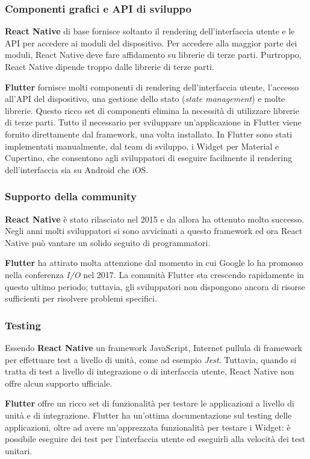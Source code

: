 \subsubsection{Componenti grafici e API di sviluppo}
\textbf{React Native} di base fornisce soltanto il rendering dell'interfaccia utente e le API per accedere ai moduli del dispositivo. Per accedere alla maggior parte dei moduli, React Native deve fare affidamento su librerie di terze parti. Purtroppo, React Native dipende troppo dalle librerie di terze parti.

\textbf{Flutter} fornisce molti componenti di rendering dell'interfaccia utente, l'accesso all'API del dispositivo, una gestione dello stato (\textit{state management}) e molte librerie. Questo ricco set di componenti elimina la necessità di utilizzare librerie di terze parti. Tutto il necessario per sviluppare un'applicazione in Flutter viene fornito direttamente dal framework, una volta installato. In Flutter sono stati implementati manualmente, dal team di sviluppo, i Widget per Material e Cupertino, che consentono agli sviluppatori di eseguire facilmente il rendering dell'interfaccia sia su Android che iOS.

\subsubsection{Supporto della community}
\textbf{React Native} è stato rilasciato nel 2015 e da allora ha ottenuto molto successo. Negli anni molti sviluppatori si sono avvicinati a questo framework ed ora React Native può vantare un solido seguito di programmatori.

\textbf{Flutter} ha attirato molta attenzione dal momento in cui Google lo ha promosso nella conferenza \textit{I/O} nel 2017. La comunità Flutter sta crescendo rapidamente in questo ultimo periodo; tuttavia, gli sviluppatori non dispongono ancora di risorse sufficienti per risolvere problemi specifici.

\subsubsection{Testing}
Essendo \textbf{React Native} un framework JavaScript, Internet pullula di framework per effettuare test a livello di unità, come ad esempio \textit{Jest}. Tuttavia, quando si tratta di test a livello di integrazione o di interfaccia utente, React Native non offre alcun supporto ufficiale.

\textbf{Flutter} offre un ricco set di funzionalità per testare le applicazioni a livello di unità e di integrazione. Flutter ha un'ottima documentazione sul testing delle applicazioni, oltre ad avere un'apprezzata funzionalità per testare i Widget: è possibile eseguire dei test per l'interfaccia utente ed eseguirli alla velocità dei test unitari.